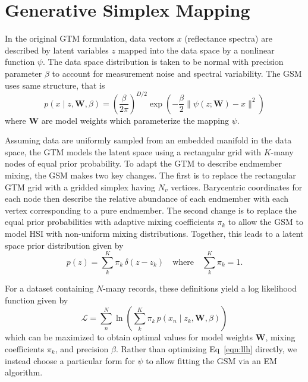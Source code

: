 \documentclass[remotesensing,article,submit,pdftex,moreauthors]{Definitions/mdpi}
\begin{document}
\section{Generative Simplex Mapping}\label{sec:gsm}

In the original GTM formulation, data vectors $x$ (reflectance spectra) are described by latent variables $z$ mapped into the data space by a nonlinear function $\psi$. The data space distribution is taken to be normal with precision parameter $\beta$ to account for measurement noise and spectral variability. The GSM uses same structure, that is
\begin{equation}\label{eqn:data-space-distribution}
    p(x \mid z, \mathbf{W}, \beta) = \left(\frac{\beta}{2\pi} \right)^{D/2}\exp\left( -\frac{\beta}{2}\lVert \psi(z; \mathbf{W}) - x \rVert^2 \right)
\end{equation}
where $\mathbf{W}$ are model weights which parameterize the mapping $\psi$.

Assuming data are uniformly sampled from an embedded manifold in the data space, the GTM models the latent space using a rectangular grid with $K$-many nodes of equal prior probability. To adapt the GTM to describe endmember mixing, the GSM makes two key changes. The first is to replace the rectangular GTM grid with a gridded simplex having $N_v$ vertices. Barycentric coordinates for each node then describe the relative abundance of each endmember with each vertex corresponding to a pure endmember. The second change is to replace the equal prior probabilities with adaptive mixing coefficients $\pi_k$ to allow the GSM to model HSI with non-uniform mixing distributions. Together, this leads to a latent space prior distribution given by
\begin{equation}\label{eqn:latent-distribution}
    p(z) = \sum\limits_k^K \pi_k \, \delta(z - z_k) \quad\text{where}\quad  \sum_k^K\pi_k = 1.
\end{equation}

For a dataset containing $N$-many records, these definitions yield a log likelihood function given by
\begin{equation}\label{eqn:llh}
    \mathcal{L} = \sum\limits_n^N \ln \left( \sum\limits_k^K \pi_k \, p(x_n \mid z_k, \mathbf{W}, \beta) \right)
\end{equation}
which can be maximized to obtain optimal values for model weights $\mathbf{W}$, mixing coefficients $\pi_k$, and precision $\beta$. Rather than optimizing Eq~\ref{eqn:llh} directly, we instead choose a particular form for $\psi$ to allow fitting the GSM via an EM algorithm.
\end{document}
